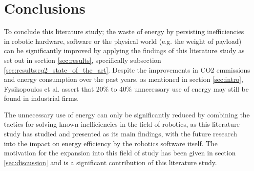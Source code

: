 \section{Conclusions}\label{sec:conclusions}
To conclude this literature study; the waste of energy by persisting inefficiencies in robotic hardware, software or the physical world
(e.g. the weight of payload) can be significantly improved by applying the findings of this literature study as set out in section 
\ref{sec:results}, specifically subsection \ref{sec:results:rq2_state_of_the_art}.
Despite the improvements in CO2 emmissions and energy consumption over the past years, as mentioned in section \ref{sec:intro}, 
Fysikopoulos et al. \cite{fysikopoulos2012automotive_energy_consumption} assert that 20\% to 40\% unnecessary use of energy may 
still be found in industrial firms.

\vspace{5mm}

The unnecessary use of energy can only be significantly reduced by combining the tactics for solving known inefficiencies in the field of robotics,
as this literature study has studied and presented as its main findings, with the future research into the impact on energy efficiency by the
robotics software itself.
The motivation for the expansion into this field of study has been given in section \ref{sec:discussion} and is a significant
contribution of this literature study.